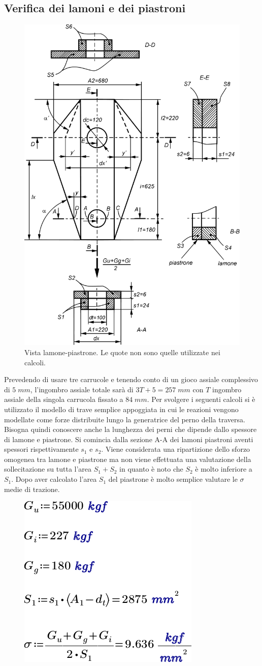 \subsection{Verifica dei lamoni e dei piastroni}
\begin{figure}[H]
\centering
  \includegraphics[width=.6\textwidth]{imgs/Cap6/3 LamPias}
\caption{Vista lamone-piastrone. Le quote non sono quelle utilizzate nei calcoli.}
\label{fig:LamPias}
\end{figure}
Prevedendo di usare tre carrucole e tenendo conto di un gioco assiale complessivo di $5\; mm$, l'ingombro assiale totale sarà di $3T+5 = 257 \; mm$ con $T$ ingombro assiale della singola carrucola fissato a $84 \;mm$. 
Per svolgere i seguenti calcoli si è utilizzato il modello di trave semplice appoggiata in cui le reazioni vengono modellate come forze distribuite lungo la generatrice del perno della traversa. 
Bisogna quindi conoscere anche la lunghezza dei perni che dipende dallo spessore di lamone e piastrone.
Si comincia dalla sezione A-A dei lamoni piastroni aventi spessori rispettivamente $s_1$ e $s_2$.
Viene considerata una ripartizione dello sforzo omogenea tra lamone e piastrone ma non viene effettuata una valutazione della sollecitazione su tutta l'area $S_1+S_2$ in quanto è noto che $S_2$ è molto inferiore a $S_1$.
Dopo aver calcolato l'area $S_1$ del piastrone è molto semplice valutare le $\sigma$ medie di trazione.
\begin{figure}[H]
\centering
  \includegraphics[width=.25\textwidth]{imgs/MathLP1}
\caption{}
\label{fig:MathLP1}
\end{figure}
